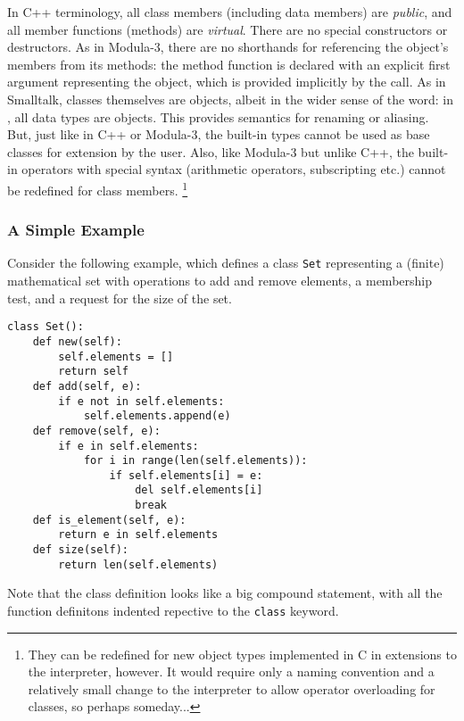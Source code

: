 In C++ terminology, all class members (including data members) are
{\em public},
and all member functions (methods) are
{\em virtual}.
There are no special constructors or destructors.
As in Modula-3, there are no shorthands for referencing the object's
members from its methods: the method function is declared with an
explicit first argument representing the object, which is provided
implicitly by the call.
As in Smalltalk, classes themselves are objects, albeit in the wider
sense of the word: in \Python, all data types are objects.
This provides semantics for renaming or aliasing.
But, just like in C++ or Modula-3, the built-in types cannot be used as
base classes for extension by the user.
Also, like Modula-3 but unlike C++, the built-in operators with special
syntax (arithmetic operators, subscripting etc.) cannot be redefined for
class members.%
\footnote{
       They can be redefined for new object types implemented in C in
       extensions to the interpreter, however.  It would require only a
       naming convention and a relatively small change to the
       interpreter to allow operator overloading for classes, so
       perhaps someday...
}

\subsubsection{A Simple Example}

Consider the following example, which defines a class {\tt Set}
representing a (finite) mathematical set with operations to add and
remove elements, a membership test, and a request for the size of the
set.
\bcode\begin{verbatim}
class Set():
    def new(self):
        self.elements = []
        return self
    def add(self, e):
        if e not in self.elements:
            self.elements.append(e)
    def remove(self, e):
        if e in self.elements:
            for i in range(len(self.elements)):
                if self.elements[i] = e:
                    del self.elements[i]
                    break
    def is_element(self, e):
        return e in self.elements
    def size(self):
        return len(self.elements)
\end{verbatim}\ecode
Note that the class definition looks like a big compound statement,
with all the function definitons indented repective to the
{\tt class}
keyword.

